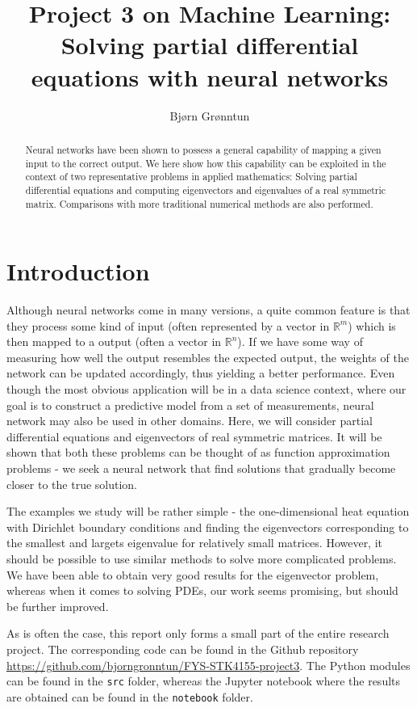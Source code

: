 \documentclass{article}
\title{Project 3 on Machine Learning: Solving partial differential equations with neural networks}
\author{Bj{\o}rn Gr{\o}nntun}
\begin{document}
\maketitle

\begin{abstract}
    Neural networks have been shown to possess a general capability of mapping a given input to the correct output. We here show how this capability can be exploited in the context of two representative problems in applied mathematics: Solving partial differential equations and computing eigenvectors and eigenvalues of a real symmetric matrix. Comparisons with more traditional numerical methods are also performed.
\end{abstract}

\section{Introduction}
Although neural networks come in many versions, a quite common feature is that they process some kind of input (often represented by a vector in $\mathbb{R}^m$) which is then mapped to a output (often a vector in $\mathbb{R}^n$). If we have some way of measuring how well the output resembles the expected output, the weights of the network can be updated accordingly, thus yielding a better performance. Even though the most obvious application will be in a data science context, where our goal is to construct a predictive model from a set of measurements, neural network may also be used in other domains. Here, we will consider partial differential equations and eigenvectors of real symmetric matrices. It will be shown that both these problems can be thought of as function approximation problems - we seek a neural network that find solutions that gradually become closer to the true solution.

The examples we study will be rather simple - the one-dimensional heat equation with Dirichlet boundary conditions and finding the eigenvectors corresponding to the smallest and largets eigenvalue for relatively small matrices. However, it should be possible to use similar methods to solve more complicated problems. We have been able to obtain very good results for the eigenvector problem, whereas when it comes to solving PDEs, our work seems promising, but should be further improved.

As is often the case, this report only forms a small part of the entire research project. The corresponding code can be found in the Github repository \url{https://github.com/bjorngronntun/FYS-STK4155-project3}. The Python modules can be found in the \texttt{src} folder, whereas the Jupyter notebook where the results are obtained can be found in the \texttt{notebook} folder.
\end{document}
